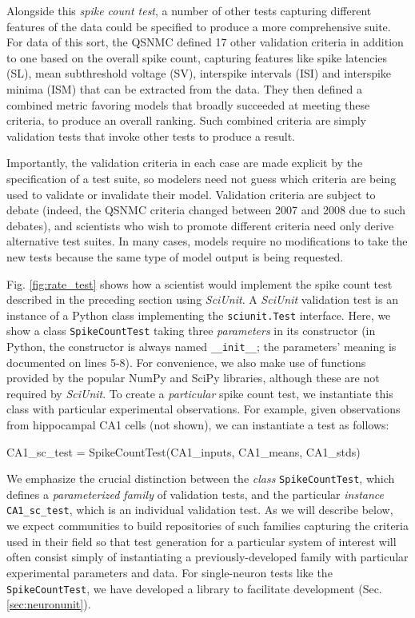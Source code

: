 \documentclass[11pt,letterpaper]{article}
\let\verbx\lstinline
\begin{document}
Alongside this \emph{spike count test}, a number of other tests capturing different features of the data could be specified to produce a more comprehensive suite. 
For data of this sort, the QSNMC defined 17 other validation criteria in addition to one based on the overall spike count, capturing features like spike latencies (SL), mean subthreshold voltage (SV), interspike intervals (ISI) and interspike minima (ISM) that can be extracted from the data\cite{jolivet_quantitative_2008}. 
They then defined a combined metric favoring models that broadly succeeded at meeting these criteria, to produce an overall ranking. 
Such combined criteria are simply validation tests that invoke other tests to produce a result.

Importantly, the validation criteria in each case are made explicit by the specification of a test suite, so modelers need not guess which criteria are being used to validate or invalidate their model. 
Validation criteria are subject to debate (indeed, the QSNMC criteria changed between 2007 and 2008 due to such debates), and scientists who wish to promote different criteria need only derive alternative test suites. 
In many cases, models require no modifications to take the new tests because the same type of model output is being requested.

Fig. \ref{fig:rate_test} shows how a scientist would implement the spike count test described in the preceding section using \textit{SciUnit}. 
A \textit{SciUnit} validation test is an {instance} of a Python class implementing the \verbx{sciunit.Test} interface. 
Here, we show a class \verbx{SpikeCountTest} taking three \emph{parameters} in its constructor (in Python, the constructor is always named \verbx{__init__}; the parameters' meaning is documented on lines 5-8). 
For convenience, we also make use of functions provided by the popular NumPy\cite{numpy_url} and SciPy\cite{scipy_url} libraries, although these are not required by \textit{SciUnit}.  
To create a \emph{particular} spike count test, we instantiate this class with particular experimental observations. 
For example, given observations from hippocampal CA1 cells (not shown), we can instantiate a test as follows:
\begin{python}
  CA1_sc_test = SpikeCountTest(CA1_inputs, CA1_means, CA1_stds)
\end{python}
We emphasize the crucial distinction between the \textit{class} \verbx{SpikeCountTest}, which defines a \emph{parameterized family} of validation tests, and the particular \textit{instance} \verbx{CA1_sc_test}, which is an individual validation test. 
As we will describe below, we expect communities to build repositories of such families capturing the criteria used in their field so that test generation for a particular system of interest will often consist simply of instantiating a previously-developed family with particular experimental parameters and data. 
For single-neuron tests like the \verbx{SpikeCountTest}, we have developed a library to facilitate development (Sec. \ref{sec:neuronunit}). 
\end{document}
